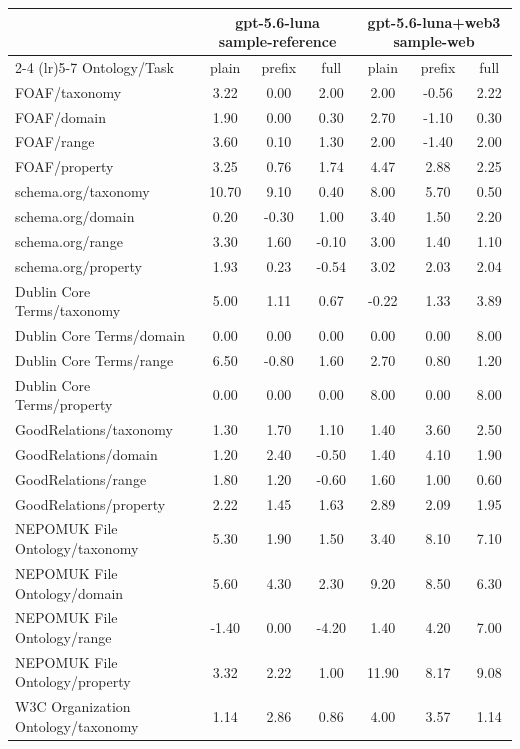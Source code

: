 \begin{tabular}{lcccccc}
\toprule
 & \multicolumn{3}{c}{gpt-5.6-luna sample-reference} & \multicolumn{3}{c}{gpt-5.6-luna+web3 sample-web} \\
\cmidrule(lr){2-4} \cmidrule(lr){5-7}
Ontology/Task & plain & prefix & full & plain & prefix & full \\
\midrule
FOAF/taxonomy & 3.22 & 0.00 & 2.00 & 2.00 & -0.56 & 2.22 \\
FOAF/domain & 1.90 & 0.00 & 0.30 & 2.70 & -1.10 & 0.30 \\
FOAF/range & 3.60 & 0.10 & 1.30 & 2.00 & -1.40 & 2.00 \\
FOAF/property & 3.25 & 0.76 & 1.74 & 4.47 & 2.88 & 2.25 \\
schema.org/taxonomy & 10.70 & 9.10 & 0.40 & 8.00 & 5.70 & 0.50 \\
schema.org/domain & 0.20 & -0.30 & 1.00 & 3.40 & 1.50 & 2.20 \\
schema.org/range & 3.30 & 1.60 & -0.10 & 3.00 & 1.40 & 1.10 \\
schema.org/property & 1.93 & 0.23 & -0.54 & 3.02 & 2.03 & 2.04 \\
Dublin Core Terms/taxonomy & 5.00 & 1.11 & 0.67 & -0.22 & 1.33 & 3.89 \\
Dublin Core Terms/domain & 0.00 & 0.00 & 0.00 & 0.00 & 0.00 & 8.00 \\
Dublin Core Terms/range & 6.50 & -0.80 & 1.60 & 2.70 & 0.80 & 1.20 \\
Dublin Core Terms/property & 0.00 & 0.00 & 0.00 & 8.00 & 0.00 & 8.00 \\
GoodRelations/taxonomy & 1.30 & 1.70 & 1.10 & 1.40 & 3.60 & 2.50 \\
GoodRelations/domain & 1.20 & 2.40 & -0.50 & 1.40 & 4.10 & 1.90 \\
GoodRelations/range & 1.80 & 1.20 & -0.60 & 1.60 & 1.00 & 0.60 \\
GoodRelations/property & 2.22 & 1.45 & 1.63 & 2.89 & 2.09 & 1.95 \\
NEPOMUK File Ontology/taxonomy & 5.30 & 1.90 & 1.50 & 3.40 & 8.10 & 7.10 \\
NEPOMUK File Ontology/domain & 5.60 & 4.30 & 2.30 & 9.20 & 8.50 & 6.30 \\
NEPOMUK File Ontology/range & -1.40 & 0.00 & -4.20 & 1.40 & 4.20 & 7.00 \\
NEPOMUK File Ontology/property & 3.32 & 2.22 & 1.00 & 11.90 & 8.17 & 9.08 \\
W3C Organization Ontology/taxonomy & 1.14 & 2.86 & 0.86 & 4.00 & 3.57 & 1.14 \\

\end{tabular}
